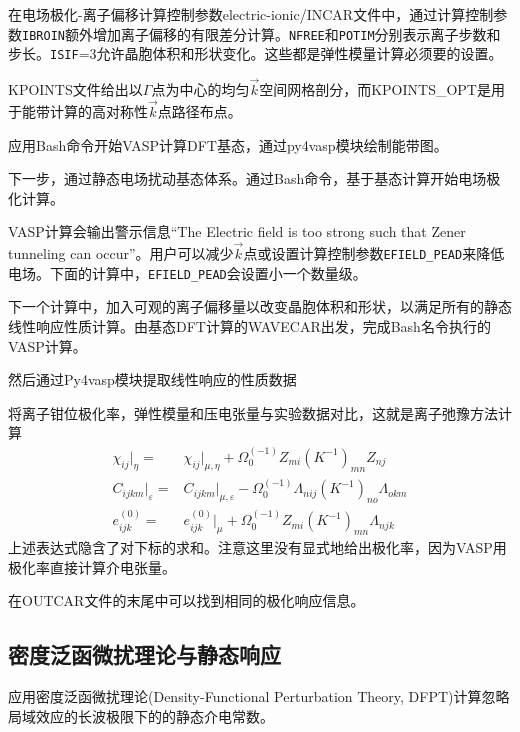 在电场极化-离子偏移计算控制参数\textrm{electric-ionic/INCAR}文件中，通过计算控制参数\texttt{IBROIN}额外增加离子偏移的有限差分计算。\texttt{NFREE}和\texttt{POTIM}分别表示离子步数和步长。\texttt{ISIF}=3允许晶胞体积和形状变化。这些都是弹性模量计算必须要的设置。

\textrm{KPOINTS}文件给出以$\Gamma$点为中心的均匀$\vec k$空间网格剖分，而\textrm{KPOINTS\_OPT}是用于能带计算的高对称性$\vec k$点路径布点。

应用\textrm{Bash}命令开始\textrm{VASP}计算\textrm{DFT}基态，通过\textrm{py4vasp}模块绘制能带图。

下一步，通过静态电场扰动基态体系。通过\textrm{Bash}命令，基于基态计算开始电场极化计算。

\textrm{VASP}计算会输出警示信息``The Electric field is too strong such that Zener tunneling can occur''。用户可以减少$\vec k$点或设置计算控制参数\texttt{EFIELD\_PEAD}来降低电场。下面的计算中，\texttt{EFIELD\_PEAD}会设置小一个数量级。

下一个计算中，加入可观的离子偏移量以改变晶胞体积和形状，以满足所有的静态线性响应性质计算。由基态\textrm{DFT}计算的\textrm{WAVECAR}出发，完成\textrm{Bash}名令执行的\textrm{VASP}计算。

然后通过\textrm{Py4vasp}模块提取线性响应的性质数据

将离子钳位极化率，弹性模量和压电张量与实验数据对比，这就是离子弛豫方法计算
\begin{displaymath}
	\begin{aligned}
		\chi_{ij}|_{\eta}=&\chi_{ij}|_{\mu,\eta}+\Omega_0^{(-1)}Z_{mi}(K^{-1})_{mn}Z_{nj}\\
		C_{ijkm}|_{\varepsilon}=&C_{ijkm}|_{\mu,\varepsilon}-\Omega_0^{(-1)}\Lambda_{nij}(K^{-1})_{no}\Lambda_{okm}\\
		e_{ijk}^{(0)}=&e_{ijk}^{(0)}|_{\mu}+\Omega_0^{(-1)}Z_{mi}(K^{-1})_{mn}\Lambda_{njk}
		\end{aligned}
\end{displaymath}
上述表达式隐含了对下标的求和。注意这里没有显式地给出极化率，因为\textrm{VASP}用极化率直接计算介电张量。%

在\textrm{OUTCAR}文件的末尾中可以找到相同的极化响应信息。

\subsection{密度泛函微扰理论与静态响应}
应用密度泛函微扰理论\textrm{(Density-Functional Perturbation Theory, DFPT)}计算忽略局域效应的长波极限下的的静态介电常数。

